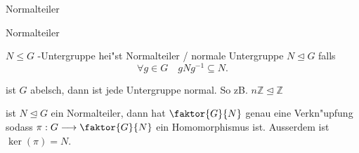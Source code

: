 \documentclass[class=article, crop=false]{standalone}
\begin{document}
\begin{zettel}{Normalteiler}
\begin{flashcard}[ykdlt3aj]{Normalteiler}
	\begin{definition}[Normalteiler]
		$N \leq G$ -Untergruppe hei"st Normalteiler / normale Untergruppe $N \trianglelefteq G$ falls
		\[
			\forall g \in  G \quad gNg^{-1}  \subseteq N
		.\]
	\end{definition}
\end{flashcard}

\begin{remark}
	ist $G$ abelsch, dann ist jede Untergruppe normal. So zB.
	$n \mathbb{Z} \trianglelefteq \mathbb{Z}$
\end{remark}

\begin{theorem}
	ist $N \trianglelefteq G$ ein Normalteiler, dann hat $\faktor{G}{N}$ genau eine Verkn"upfung sodass $\pi : G \longrightarrow \faktor{G}{N}$ ein Homomorphismus ist. Ausserdem ist $ \ker ( \pi ) = N$.
\end{theorem}

\end{zettel}
\end{document}
